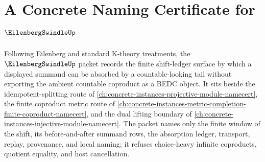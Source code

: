 \chapter{A Concrete Naming Certificate for $\EilenbergSwindleUp$}
\label{ch:concrete-instances-eilenberg-swindle-namecert}

Following Eilenberg and standard K-theory treatments, the $\EilenbergSwindleUp$ packet records the finite shift-ledger surface by which a displayed summand can be absorbed by a countable-looking tail without exporting the ambient countable coproduct as a BEDC object. It sits beside the idempotent-splitting route of \autoref{ch:concrete-instances-projective-module-namecert}, the finite coproduct metric route of \autoref{ch:concrete-instances-metric-completion-finite-coproduct-namecert}, and the dual lifting boundary of \autoref{ch:concrete-instances-injective-module-namecert}. The packet names only the finite window of the shift, its before-and-after summand rows, the absorption ledger, transport, replay, provenance, and local naming; it refuses choice-heavy infinite coproducts, quotient equality, and host cancellation.

